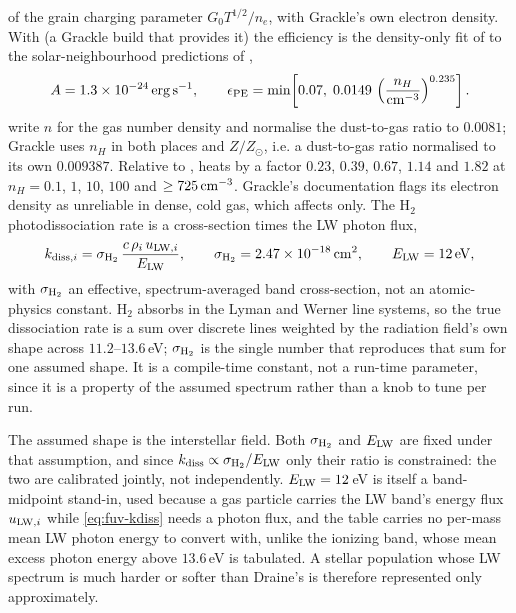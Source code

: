 of the grain charging parameter $G_0 T^{1/2}/n_e$, with Grackle's own
electron density. With  (a Grackle build that
provides it) the efficiency is the density-only fit of
\citet[their Eqs.~A1--A2]{Smith2026} to the solar-neighbourhood
predictions of \citet{Wolfire2003},
\begin{equation}
  A = 1.3\times10^{-24}\,{\rm erg\,s^{-1}}, \qquad
  \epsilon_{\rm PE} = \min\!\left[0.07,\;
    0.0149\,\left(\frac{n_H}{{\rm cm^{-3}}}\right)^{0.235}\right] .
  \label{eq:fuv-pe-efficiency-density}
\end{equation}
\citet{Smith2026} write $n$ for the gas number density and normalise the
dust-to-gas ratio to $0.0081$; Grackle uses $n_H$ in both places and
$Z/Z_\odot$, i.e. a dust-to-gas ratio normalised to its own $0.009387$.
Relative to ,  heats by a factor
$0.23$, $0.39$, $0.67$, $1.14$ and $1.82$ at $n_H = 0.1$, $1$, $10$, $100$
and $\ge 725\,{\rm cm^{-3}}$. Grackle's documentation flags its electron
density as unreliable in dense, cold gas, which affects
 only.
The H$_2$ photodissociation
rate is a cross-section times the LW photon flux,
\begin{equation}
  k_{{\rm diss},i} = \sigma_{\rm H_2}\,
    \frac{c\,\rho_i\,u_{{\rm LW},i}}{E_{\rm LW}} , \qquad
  \sigma_{\rm H_2} = 2.47\times10^{-18}\,{\rm cm^2}, \qquad
  E_{\rm LW} = 12\,{\rm eV} ,
  \label{eq:fuv-kdiss}
\end{equation}
with $\sigma_{\rm H_2}$ an effective, spectrum-averaged band cross-section,
not an atomic-physics constant. H$_2$ absorbs in the Lyman and Werner
line systems, so the true dissociation rate is a sum over discrete lines
weighted by the radiation field's own shape across $11.2$--$13.6$\,eV;
$\sigma_{\rm H_2}$ is the single number that reproduces that sum for one
assumed shape. It is a compile-time constant,
not a run-time parameter, since it is a property of the assumed spectrum
rather than a knob to tune per run.

The assumed shape is the \citet{Draine1978} interstellar field. Both
$\sigma_{\rm H_2}$ and $E_{\rm LW}$ are fixed under that assumption, and
since $k_{\rm diss}\propto\sigma_{\rm H_2}/E_{\rm LW}$ only their ratio is
constrained: the two are calibrated jointly, not independently.
$E_{\rm LW} = 12$\,eV is itself a band-midpoint stand-in, used because a
gas particle carries the LW band's energy flux $u_{{\rm LW},i}$ while
\eqref{eq:fuv-kdiss} needs a photon flux, and the table carries no per-mass
mean LW photon energy to convert with, unlike the ionizing band, whose
mean excess photon energy above $13.6$\,eV is tabulated. A stellar population whose LW
spectrum is much harder or softer than Draine's is therefore represented
only approximately.

